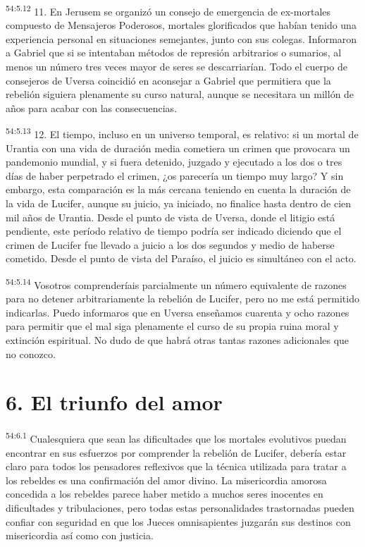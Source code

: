\par
\textsuperscript{54:5.12} 11. En Jerusem se organizó un consejo de emergencia de ex-mortales compuesto de Mensajeros Poderosos, mortales glorificados que habían tenido una experiencia personal en situaciones semejantes, junto con sus colegas. Informaron a Gabriel que si se intentaban métodos de represión arbitrarios o sumarios, al menos un número tres veces mayor de seres se descarriarían. Todo el cuerpo de consejeros de Uversa coincidió en aconsejar a Gabriel que permitiera que la rebelión siguiera plenamente su curso natural, aunque se necesitara un millón de años para acabar con las consecuencias.

\par
\textsuperscript{54:5.13} 12. El tiempo, incluso en un universo temporal, es relativo: si un mortal de Urantia con una vida de duración media cometiera un crimen que provocara un pandemonio mundial, y si fuera detenido, juzgado y ejecutado a los dos o tres días de haber perpetrado el crimen, ¿os parecería un tiempo muy largo? Y sin embargo, esta comparación es la más cercana teniendo en cuenta la duración de la vida de Lucifer, aunque su juicio, ya iniciado, no finalice hasta dentro de cien mil años de Urantia. Desde el punto de vista de Uversa, donde el litigio está pendiente, este período relativo de tiempo podría ser indicado diciendo que el crimen de Lucifer fue llevado a juicio a los dos segundos y medio de haberse cometido. Desde el punto de vista del Paraíso, el juicio es simultáneo con el acto.

\par
\textsuperscript{54:5.14} Vosotros comprenderíais parcialmente un número equivalente de razones para no detener arbitrariamente la rebelión de Lucifer, pero no me está permitido indicarlas. Puedo informaros que en Uversa enseñamos cuarenta y ocho razones para permitir que el mal siga plenamente el curso de su propia ruina moral y extinción espiritual. No dudo de que habrá otras tantas razones adicionales que no conozco.

\section*{6. El triunfo del amor}
\par
\textsuperscript{54:6.1} Cualesquiera que sean las dificultades que los mortales evolutivos puedan encontrar en sus esfuerzos por comprender la rebelión de Lucifer, debería estar claro para todos los pensadores reflexivos que la técnica utilizada para tratar a los rebeldes es una confirmación del amor divino. La misericordia amorosa concedida a los rebeldes parece haber metido a muchos seres inocentes en dificultades y tribulaciones, pero todas estas personalidades trastornadas pueden confiar con seguridad en que los Jueces omnisapientes juzgarán sus destinos con misericordia así como con justicia.

